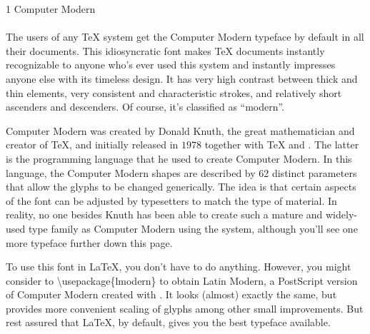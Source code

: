 \documentclass{article}
\begin{document}
\frenchspacing

\noindent
{\LARGE 1 Computer Modern}\\
~\\
\noindent
The users of any \TeX{} system get the Computer Modern typeface by default in
all their documents.  This idiosyncratic font makes \TeX{} documents
instantly recognizable to anyone who's ever used this system and instantly
impresses anyone else with its timeless design.  It has very high contrast
between thick and thin elements, very consistent and characteristic
strokes, and relatively short ascenders and descenders.  Of course, it's
classified as ``modern''.

Computer Modern was created by Donald Knuth, the great mathematician and
creator of \TeX, and initially released in $1978$ together with \TeX{} and
\MF.  The latter is the programming language that he used to create Computer
Modern.  In this language, the Computer Modern shapes are described by 62
distinct parameters that allow the glyphs to be changed generically.  The
idea is that certain aspects of the font can be adjusted by typesetters to
match the type of material.  In reality, no one besides Knuth has been able
to create such a mature and widely-used type family as Computer Modern using
the \MF{} system, although you'll see one more \MF{} typeface further down
this page.

To use this font in \LaTeX, you don't have to do anything. However, you might consider
to \textbackslash usepackage\{lmodern\} to obtain Latin Modern,
a PostScript version of Computer Modern created with \MP.  It looks
(almost) exactly the same, but provides more convenient scaling of glyphs
among other small improvements.  But rest assured that \LaTeX{}, by default,
gives you the best typeface available.
\end{document}
